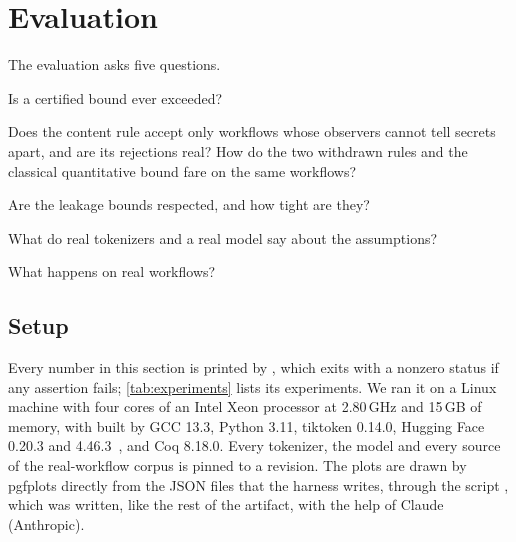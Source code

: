 \section{Evaluation}\label{sec:evaluation}

The evaluation asks five questions.

\begin{description}[leftmargin=2.6em, style=nextline, itemsep=1pt]
\item[RQ1] Is a certified bound ever exceeded?
\item[RQ2] Does the content rule accept only workflows whose observers cannot tell
  secrets apart, and are its rejections real? How do the two withdrawn rules and the
  classical quantitative bound fare on the same workflows?
\item[RQ3] Are the leakage bounds respected, and how tight are they?
\item[RQ4] What do real tokenizers and a real model say about the assumptions?
\item[RQ5] What happens on real workflows?
\end{description}

\subsection{Setup}\label{sec:eval-setup}

Every number in this section is printed by , which exits
with a nonzero status if any assertion fails; \cref{tab:experiments} lists its
experiments. We ran it on a Linux machine with four cores of an Intel Xeon processor
at 2.80\,GHz and 15\,GB of memory, with  built by GCC 13.3, Python 3.11,
tiktoken 0.14.0, Hugging Face  0.20.3 and 
4.46.3~\cite{wolf2020transformers}, and Coq 8.18.0. Every tokenizer, the model and
every source of the real-workflow corpus is pinned to a revision. The plots are drawn by
pgfplots directly from the JSON files that the harness writes, through the script
, which was written, like the rest of the artifact,
with the help of Claude (Anthropic).

